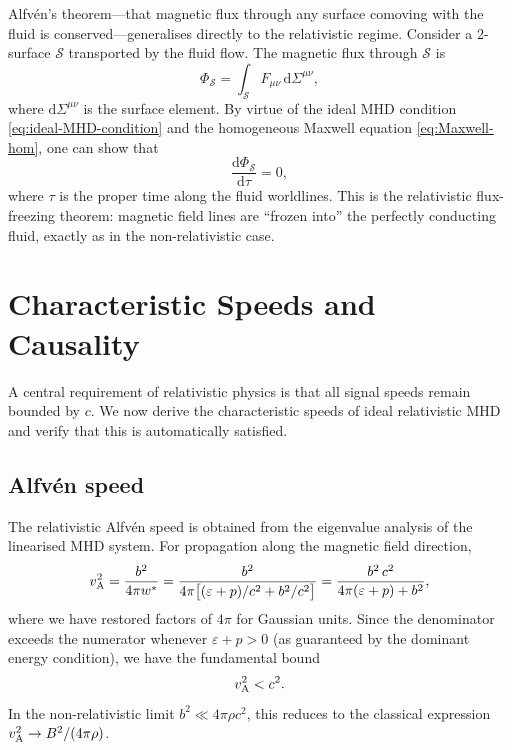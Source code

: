 Alfv\'en's theorem---that magnetic flux through any surface comoving
with the fluid is conserved---generalises directly to the relativistic
regime.  Consider a 2-surface $\mathcal{S}$ transported by the fluid
flow.  The magnetic flux through $\mathcal{S}$ is
\begin{equation}
  \Phi_{\mathcal{S}}
  = \int_{\mathcal{S}} F_{\mu\nu}\,\mathrm{d}\Sigma^{\mu\nu},
  \label{eq:flux-def}
\end{equation}
where $\mathrm{d}\Sigma^{\mu\nu}$ is the surface element.  By virtue of the
ideal MHD condition \eqref{eq:ideal-MHD-condition} and the homogeneous
Maxwell equation \eqref{eq:Maxwell-hom}, one can show that
\begin{equation}
  \frac{\mathrm{d}\Phi_{\mathcal{S}}}{\mathrm{d}\tau} = 0,
  \label{eq:flux-freezing}
\end{equation}
where $\tau$ is the proper time along the fluid worldlines.  This is the
relativistic flux-freezing theorem: magnetic field lines are ``frozen
into'' the perfectly conducting fluid, exactly as in the non-relativistic
case.


\section{Characteristic Speeds and Causality}
\label{sec:char-speeds}

A central requirement of relativistic physics is that all signal speeds
remain bounded by $c$.  We now derive the characteristic speeds of ideal
relativistic MHD and verify that this is automatically satisfied.

\subsection{Alfv\'en speed}

The relativistic Alfv\'en speed is obtained from the eigenvalue analysis
of the linearised MHD system.  For propagation along the magnetic field
direction,
\begin{equation}
  v_{\mathrm{A}}^{2}
  = \frac{b^{2}}{4\pi w^{\ast}}
  = \frac{b^{2}}{4\pi\bigl[(\varepsilon + p)/c^{2} + b^{2}/c^{2}\bigr]}
  = \frac{b^{2}\,c^{2}}{4\pi(\varepsilon + p) + b^{2}},
  \label{eq:vA-rel}
\end{equation}
where we have restored factors of $4\pi$ for Gaussian units.  Since the
denominator exceeds the numerator whenever $\varepsilon + p > 0$ (as
guaranteed by the dominant energy condition), we have the fundamental bound
\begin{equation}
  v_{\mathrm{A}}^{2} < c^{2}.
  \label{eq:vA-bound}
\end{equation}
In the non-relativistic limit $b^{2} \ll 4\pi\rho c^{2}$, this reduces to
the classical expression $v_{\mathrm{A}}^{2} \to B^{2}/(4\pi\rho)$.

